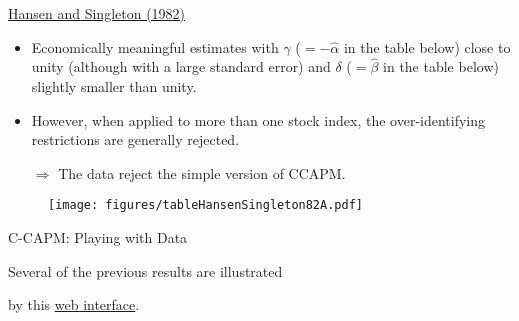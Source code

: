 \begin{frame}
\begin{scriptsize}
\begin{exampleblock}{\href{https://www.jstor.org/stable/1911873?seq=1\#page_scan_tab_contents}{Hansen and Singleton (1982)}}
\begin{itemize}
	\item Economically meaningful estimates with $\gamma$ ($=-\hat\alpha$ in the table below) close to unity (although with a large standard error) and $\delta$ ($=\hat\beta$ in the table below) slightly smaller than unity.
	\item However, when applied to more than one stock index, the over-identifying restrictions are generally rejected.
	\item[$\Rightarrow$] The data reject the simple version of CCAPM.
\end{itemize}
		\begin{figure}
			\texttt{[image: figures/tableHansenSingleton82A.pdf]}
		\end{figure}
\end{exampleblock}
\end{scriptsize}
\end{frame}

\begin{frame}{C-CAPM: Playing with Data}
\begin{center}
Several of the previous results are illustrated

by this \href{https://jrenne.shinyapps.io/APModels}{web interface}.
\end{center}
\end{frame}



